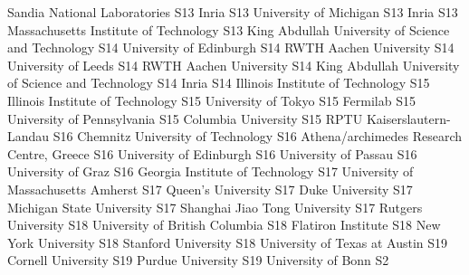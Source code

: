 \begin{multicols}{2}
{Sandia National Laboratories}
{S13}
{}
{Inria}
{S13}
{}
{University of Michigan}
{S13}
{}
{Inria}
{S13}
{}
{Massachusetts Institute of Technology}
{S13}
{}
{King Abdullah University of Science and Technology}
{S14}
{}
{University of Edinburgh}
{S14}
{}
{RWTH Aachen University}
{S14}
{}
{University of Leeds}
{S14}
{}
{RWTH Aachen University}
{S14}
{}
{King Abdullah University of Science and Technology}
{S14}
{}
{Inria}
{S14}
{}
{Illinois Institute of Technology}
{S15}
{}
{Illinois Institute of Technology}
{S15}
{}
{University of Tokyo}
{S15}
{}
{Fermilab}
{S15}
{}
{University of Pennsylvania}
{S15}
{}
{Columbia University}
{S15}
{}
{RPTU Kaiserslautern-Landau}
{S16}
{}
{Chemnitz University of Technology}
{S16}
{}
{Athena/archimedes Research Centre, Greece}
{S16}
{}
{University of Edinburgh}
{S16}
{}
{University of Passau}
{S16}
{}
{University of Graz}
{S16}
{}
{Georgia Institute of Technology}
{S17}
{}
{University of Massachusetts Amherst}
{S17}
{}
{Queen's University}
{S17}
{}
{Duke University}
{S17}
{}
{Michigan State University}
{S17}
{}
{Shanghai Jiao Tong University}
{S17}
{}
{Rutgers University}
{S18}
{}
{University of British Columbia}
{S18}
{}
{Flatiron Institute}
{S18}
{}
{New York University}
{S18}
{}
{Stanford University}
{S18}
{}
{University of Texas at Austin}
{S19}
{}
{Cornell University}
{S19}
{}
{Purdue University}
{S19}
{}
{University of Bonn}
{S2}
{}

\end{multicols}
